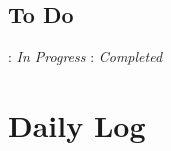 \documentclass[11pt,letterpaper]{article}
\begin{document}
\subsection*{To Do}
\begin{bullets}
\item
\end{bullets}

\textleaf : \textit{In Progress} \qquad \checkmark : \textit{Completed}

\section*{Daily Log}
\end{document}
